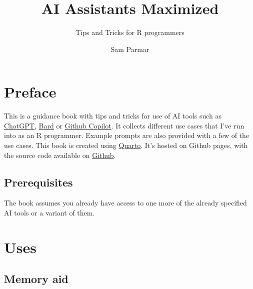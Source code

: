 \documentclass[
  letterpaper,
  DIV=11,
  numbers=noendperiod]{scrreprt}
\title{AI Assistants Maximized}
\subtitle{Tips and Tricks for R programmers}
\author{Sam Parmar}
\date{}
\renewcommand*\contentsname{Table of contents}
\newcommand\contentsname{Table of contents}
\begin{document}
\maketitle
\ifdefined\Shaded\renewenvironment{Shaded}{\begin{tcolorbox}[frame hidden, enhanced, boxrule=0pt, sharp corners, borderline west={3pt}{0pt}{shadecolor}, breakable, interior hidden]}{\end{tcolorbox}}\fi

\renewcommand*\contentsname{Table of contents}
{
\hypersetup{linkcolor=}
\setcounter{tocdepth}{2}
\tableofcontents
}

\hypertarget{preface}{%
\chapter*{Preface}\label{preface}}


This is a guidance book with tips and tricks for use of AI tools such as
\href{https://chat.openai.com/}{ChatGPT},
\href{https://bard.google.com/}{Bard} or
\href{https://github.com/features/copilot}{Github Copilot}. It collects
different use cases that I've run into as an R programmer. Example
prompts are also provided with a few of the use cases. This book is
created using \href{https://quarto.org/}{Quarto}. It's hosted on Github
pages, with the source code available on
\href{https:://www.github.com/parmsam/tips-and-tricks-ai-tools}{Github}.

\hypertarget{prerequisites}{%
\section*{Prerequisites}\label{prerequisites}}


The book assumes you already have access to one more of the already
specified AI tools or a variant of them.


\hypertarget{uses}{%
\chapter{Uses}\label{uses}}

\hypertarget{memory-aid}{%
\section{Memory aid}\label{memory-aid}}
\end{document}
